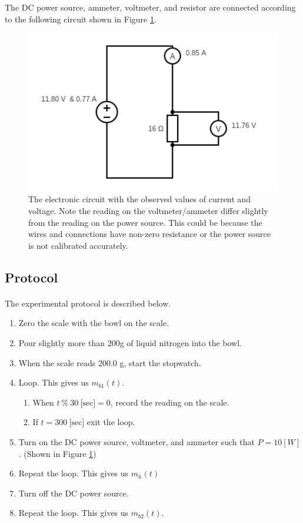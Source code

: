 \documentclass{article}
\begin{document}
The DC power source, ammeter, voltmeter, and resistor are connected according to the following circuit shown in Figure \ref{fig:circuit}.

\begin{figure}[H]
  \includegraphics[width=\textwidth]{./img/circuit.pdf}
  \caption{The electronic circuit with the observed values of current and voltage. Note the reading on the voltmeter/ammeter differ slightly from the reading on the power source. This could be because the wires and connections have non-zero resistance or the power source is not calibrated accurately.}
  \label{fig:circuit}
\end{figure}

\subsection{Protocol}
\paragraph{}
The experimental protocol is described below.

\begin{enumerate}
  \item Zero the scale with the bowl on the scale.
  \item Pour slightly more than 200g of liquid nitrogen into the bowl.
  \item When the scale reads 200.0 g, start the stopwatch.
  \item Loop. This gives us $m_{b1}(t)$.
    \begin{enumerate}
      \item When $t ~\%~ 30 ~\text{[sec]} = 0$, record the reading on the scale.
      \item If $t = 300 ~\text{[sec]}$ exit the loop.
    \end{enumerate}
  \item Turn on the DC power source, voltmeter, and ammeter such that $P = 10 [W]$. (Shown in Figure \ref{fig:circuit})
  \item Repeat the loop. This gives us $m_h(t)$
  \item Turn off the DC power source.
  \item Repeat the loop. This gives us $m_{b2}(t)$.
\end{enumerate}
\end{document}
